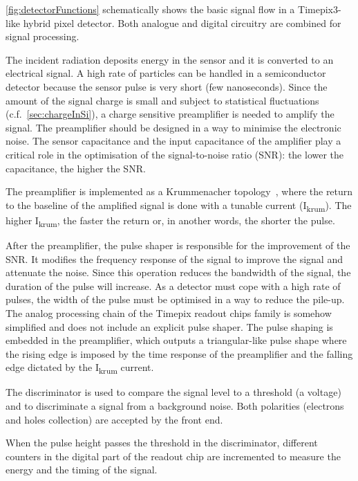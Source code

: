 \cref{fig:detectorFunctions} schematically shows the basic signal flow
in a Timepix3-like hybrid pixel detector. Both analogue and digital
circuitry are combined for signal processing.

The incident radiation deposits energy in the sensor and it is
converted to an electrical signal. A high rate of particles can be
handled in a semiconductor detector because the sensor pulse is very
short (few nanoseconds). Since the amount of the signal charge is
small and subject to statistical fluctuations
(c.f.~\cref{sec:chargeInSi}), a charge sensitive preamplifier is
needed to amplify the signal. The preamplifier should be designed in a
way to minimise the electronic noise. The sensor capacitance and the
input capacitance of the amplifier play a critical role in the
optimisation of the signal-to-noise ratio (SNR): the lower the
capacitance, the higher the SNR.

The preamplifier is implemented as a Krummenacher
topology~\cite{KRUMMENACHER1991527}, where the return to the baseline
of the amplified signal is done with a tunable current
(I\textsubscript{krum}). The higher I\textsubscript{krum}, the faster
the return or, in another words, the shorter the pulse.

After the preamplifier, the pulse shaper is responsible for the
improvement of the SNR. It modifies the frequency response of the
signal to improve the signal and attenuate the noise. Since this
operation reduces the bandwidth of the signal, the duration of the
pulse will increase. As a detector must cope with a high rate of
pulses, the width of the pulse must be optimised in a way to reduce
the pile-up. The analog processing chain of the Timepix readout chips
family is somehow simplified and does not include an explicit pulse
shaper. The pulse shaping is embedded in the preamplifier, which
outputs a triangular-like pulse shape where the rising edge is imposed
by the time response of the preamplifier and the falling edge dictated
by the I\textsubscript{krum} current.

The discriminator is used to compare the signal level to a
threshold (a voltage) and to discriminate a signal from a background
noise. Both polarities (electrons and holes collection) are accepted
by the front end.

When the pulse height passes the threshold in the discriminator,
different counters in the digital part of the readout chip are
incremented to measure the energy and the timing of the signal.

